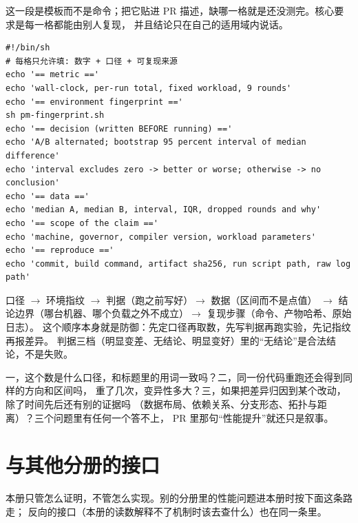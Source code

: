 \documentclass[12pt,a4paper,fontset=fandol]{ctexbook}
\begin{document}
这一段是模板而不是命令；把它贴进 PR 描述，缺哪一格就是还没测完。核心要求是每一格都能由别人复现，
并且结论只在自己的适用域内说话。

\begin{lstlisting}[style=shellstyle,caption={结论模板的填空骨架（六格顺序与结论体检表对应）},label={lst:pmapC-pr}]
#!/bin/sh
# 每格只允许填: 数字 + 口径 + 可复现来源
echo '== metric =='
echo 'wall-clock, per-run total, fixed workload, 9 rounds'
echo '== environment fingerprint =='
sh pm-fingerprint.sh
echo '== decision (written BEFORE running) =='
echo 'A/B alternated; bootstrap 95 percent interval of median difference'
echo 'interval excludes zero -> better or worse; otherwise -> no conclusion'
echo '== data =='
echo 'median A, median B, interval, IQR, dropped rounds and why'
echo '== scope of the claim =='
echo 'machine, governor, compiler version, workload parameters'
echo '== reproduce =='
echo 'commit, build command, artifact sha256, run script path, raw log path'
\end{lstlisting}

\begin{guideline}[title={写结论的六格顺序，缺一格就别写数字}]
口径 $\rightarrow$ 环境指纹 $\rightarrow$ 判据（跑之前写好）$\rightarrow$ 数据（区间而不是点值）
$\rightarrow$ 结论边界（哪台机器、哪个负载之外不成立）$\rightarrow$ 复现步骤（命令、产物哈希、原始日志）。
这个顺序本身就是防御：先定口径再取数，先写判据再跑实验，先记指纹再报差异。
判据三档（明显变差、无结论、明显变好）里的``无结论''是合法结论，不是失败。
\end{guideline}

\begin{bestpractice}[title={评审时该问的三个问题}]
一，这个数是什么口径，和标题里的用词一致吗？二，同一份代码重跑还会得到同样的方向和区间吗，
重了几次，变异性多大？三，如果把差异归因到某个改动，除了时间先后还有别的证据吗
（数据布局、依赖关系、分支形态、拓扑与距离）？三个问题里有任何一个答不上，
PR 里那句``性能提升''就还只是叙事。
\end{bestpractice}

\section{与其他分册的接口}
\label{sec:pmapC-crossref}

本册只管怎么证明，不管怎么实现。别的分册里的性能问题进本册时按下面这条路走；
反向的接口（本册的读数解释不了机制时该去查什么）也在同一条里。
\end{document}
